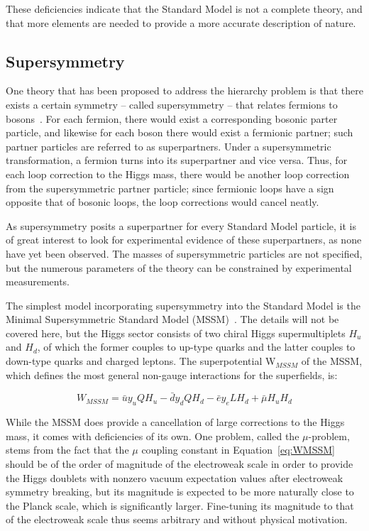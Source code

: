 These deficiencies indicate that the Standard Model is not a complete theory, and that more elements are needed to provide a more accurate description of nature.

\subsection{Supersymmetry}

One theory that has been proposed to address the hierarchy problem is that there exists a certain symmetry -- called supersymmetry -- that relates fermions to bosons~\cite{Martin:1997ns}. For each fermion, there would exist a corresponding bosonic parter particle, and likewise for each boson there would exist a fermionic partner; such partner particles are referred to as superpartners. Under a supersymmetric transformation, a fermion turns into its superpartner and vice versa. Thus, for each loop correction to the Higgs mass, there would be another loop correction from the supersymmetric partner particle; since fermionic loops have a sign opposite that of bosonic loops, the loop corrections would cancel neatly.

As supersymmetry posits a superpartner for every Standard Model particle, it is of great interest to look for experimental evidence of these superpartners, as none have yet been observed. The masses of supersymmetric particles are not specified, but the numerous parameters of the theory can be constrained by experimental measurements.

The simplest model incorporating supersymmetry into the Standard Model is the Minimal Supersymmetric Standard Model (MSSM)~\cite{Martin:1997ns}. The details will not be covered here, but the Higgs sector consists of two chiral Higgs supermultiplets $H_u$ and $H_d$, of which the former couples to up-type quarks and the latter couples to down-type quarks and charged leptons. The superpotential W$_{MSSM}$ of the MSSM, which defines the most general non-gauge interactions for the superfields, is:

\begin{equation}
W_{MSSM} = \bar{u}y_{u}QH_{u} - \bar{d}y_{d}QH_{d} - \bar{e}y_{e}LH_{d} + \bar{\mu}H_{u}H_{d}
\label{eq:WMSSM}
\end{equation}

While the MSSM does provide a cancellation of large corrections to the Higgs mass, it comes with deficiencies of its own. One problem, called the $\mu$-problem, stems from the fact that the $\mu$ coupling constant in Equation~\ref{eq:WMSSM} should be of the order of magnitude of the electroweak scale in order to provide the Higgs doublets with nonzero vacuum expectation values after electroweak symmetry breaking, but its magnitude is expected to be more naturally close to the Planck scale, which is significantly larger. Fine-tuning its magnitude to that of the electroweak scale thus seems arbitrary and without physical motivation.

